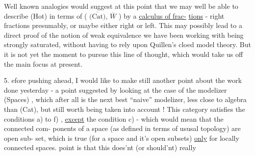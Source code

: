 Well known analogies would suggest at this point that we may well be
able to describe (Hot) in terms of ( $\overline{\text{(Cat)}}$, $\overline{W}$ ) by a \uline{calculus of frac-}%
\uline{tions} - right fractions presumably, or maybe either right or left. This
may possibly lead to a direct proof of the notion of weak equivalence we
have been working with being strongly saturated, without having to rely
upon Quillen's cloed model theory. But it is not yet the moment to pursue
this line of thought, which would take us off the main focus at present.

5. efore pushing ahead, I would like to make still another point
about the work done yesterday - a point suggested by looking at the
case of the modelizer (Spaces) , which after all is the next best
``naive'' modelizer, less close to algebra than (Cat), but still worth
being taken into account ! This category satisfies the conditions a) to
f) , \uline{except} the condition c) - which would mean that the connected com-%
ponents of a space (as defined in terms of ususal topology) are open sub-%
set, which is true (for a space and it's open subsets) \uline{only} for locally
connected spaces.  point is that this does'nt (or should'nt) really

